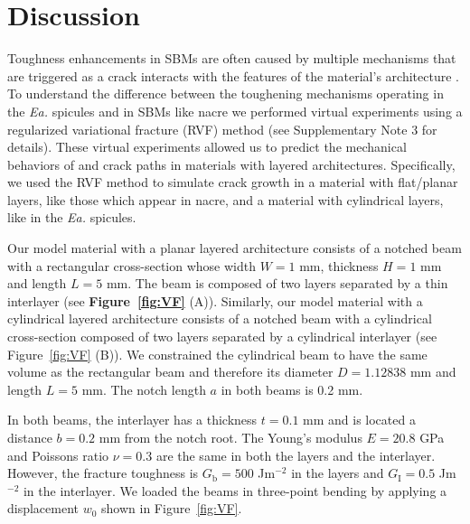 \documentclass[12pt,onecolumn]{article}
\makeatletter
\newcommand{\EA}{\textit{Ea.\@}\xspace}
\makeatother
\begin{document}
\section*{Discussion}
\label{sec:discussion}
Toughness enhancements in SBMs are often caused by multiple mechanisms that are triggered as a crack interacts with the features of the material's architecture \cite{barthelat2007experimental,currey1977,launey2009fracture}. 
%
To understand the difference between the toughening mechanisms operating in the \EA spicules and in SBMs like nacre we performed virtual experiments using a regularized variational fracture (RVF) method (see Supplementary Note 3 for details). These virtual experiments allowed us to predict the  mechanical behaviors of and crack paths in materials with layered architectures. Specifically, we used the RVF method to simulate crack growth in a material with flat/planar layers, like those which appear in nacre, and a material with cylindrical layers, like in the \EA spicules.

Our model material with a planar layered architecture consists of a notched beam with a rectangular cross-section whose width $W=1$ mm, thickness $H=1$ mm and length $L=5$ mm. The beam is composed of two layers separated by a thin interlayer (see {\bf Figure~\ref{fig:VF}} (A)). Similarly, our model material with a cylindrical layered architecture consists of a notched beam with a cylindrical cross-section composed of two layers separated by a cylindrical interlayer (see Figure~\ref{fig:VF} (B)). We constrained the cylindrical beam to have the same volume as the rectangular beam and therefore its diameter $D=1.12838$ mm and length $L=5$ mm. The notch length $a$ in both beams is 0.2 mm.

In both beams, the interlayer has a thickness $t = 0.1$ mm and is located a distance $b = 0.2$ mm from the notch root. The Young's modulus $E = 20.8$ GPa and Poissons ratio $\nu = 0.3$ are the same in both the layers and the interlayer. However, the fracture toughness is $G_\mathrm{b} = 500$ Jm$^{-2}$ in the layers and $G_\mathrm{I} = 0.5$ Jm$^{-2}$ in the interlayer. We loaded the beams in three-point bending by applying a displacement $w_0$ shown in Figure~\ref{fig:VF}. 
\end{document}
